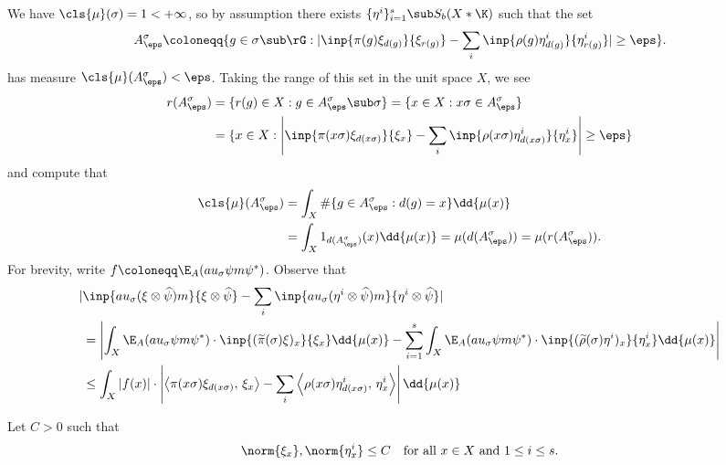 \documentclass[12pt]{article}
\begin{document}
We have $ \cls{\mu}(\sigma) =1 <+\infty $, so by assumption there exists $ \{\eta^{i}\}_{i=1}^{s}\sub S_{b}(X \ast \K) $ such that the set  
\[
    A^{\sigma}_{\eps} \coloneqq \{g\in \sigma\sub \rG : |\inp{\pi(g) \xi_{d(g)}}{\xi_{r(g)}} - \sum_{i}\inp{\rho(g) \eta^{i}_{d(g)}}{\eta^{i}_{r(g)}}|\geq \eps\}.
\]
has measure $ \cls{\mu}(A^{\sigma}_{\eps})<\eps $. Taking the range of this set in the unit space $ X $, we see
\begin{align*}
    r(A^{\sigma}_{\eps}) &= \{r(g)\in X : g\in A^{\sigma}_{\eps}\sub \sigma\}= \{x\in X: x \sigma \in A^{\sigma}_{\eps}\}\\
    &=\{x\in X: \left|\inp{\pi(x \sigma) \xi_{d(x \sigma)}}{\xi_{x}} - \sum_{i}\inp{\rho( x \sigma) \eta^{i}_{d( x \sigma)}}{\eta^{i}_{x}}\right|\geq \eps\}
\end{align*}
and compute that 
\begin{align*}
    \cls{\mu}(A^{\sigma}_{\eps}) &= \int_{X}  \#\{g\in A^{\sigma}_{\eps}: d(g) = x\} \dd{\mu(x)}\\
    &=\int_{X} 1_{d(A^{\sigma}_{\eps})}(x) \dd{\mu(x)} = \mu(d(A^{\sigma}_{\eps})) = \mu(r(A^{\sigma}_{\eps})).
\end{align*}
For brevity, write $ f\coloneqq \E_{A}(au_{\sigma} \psi m\psi^{*}) $. Observe that
\begin{align*}
    | & \inp{au_{\sigma}(\xi \otimes \widehat{\psi}) m}{\xi \otimes \widehat{\psi}} - \sum_{i}\inp{au_{\sigma} (\eta^{i}\otimes \widehat{\psi})m}{\eta^{i} \otimes \widehat{\psi}}|  \\ 
    &=\left|\int_{X}\E_{A}(au_{\sigma} \psi m\psi^{*}) \cdot \inp{(\widetilde{\pi}(\sigma) \xi)_{x}}{\xi_{x}}\dd{\mu(x)} - \sum_{i=1}^{s} \int_{X}\E_{A}(au_{\sigma} \psi m\psi^{*}) \cdot \inp{(\widetilde{\rho}(\sigma) \eta^{i})_{x}}{\eta^{i}_{x}}\dd{\mu(x)} \right|\\
    &\leq\int_{X}|f(x)| \cdot\left| \left\langle\pi(x \sigma) \xi_{d(x \sigma)},\,\xi_{x}\right\rangle - \sum_{i}  \left\langle\rho(x \sigma) \eta^{i}_{d(x \sigma)},\,\eta^{i}_{x}\right\rangle\right|\dd{\mu(x)} 
\end{align*}

Let $ C>0 $ such that 
\[
  \norm{\xi_{x}}, \norm{\eta^{i}_{x}} \leq C \quad \text{for all }x\in X \text{ and }1\leq i \leq s.
\]
\end{document}
